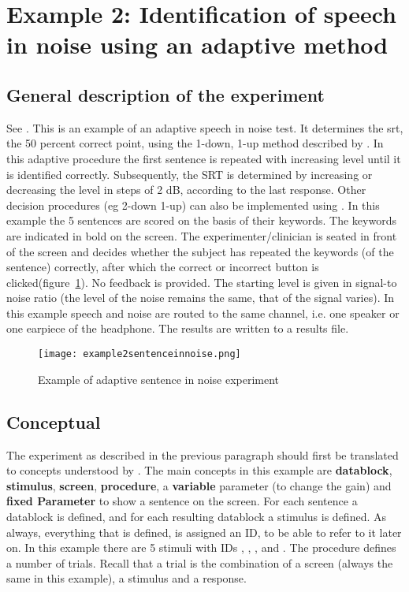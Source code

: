 \newpage
\section{Example 2: Identification of speech in noise using an adaptive method}

\subsection{General description of the experiment}
See . This is an
example of an adaptive speech in noise test. It determines the
 \ac{srt}, the 50 percent correct point, using
the 1-down, 1-up method described by \citet{PM79}. In this
adaptive procedure the first sentence is repeated with increasing
level until it is identified correctly. Subsequently, the SRT is
determined by increasing or decreasing the level in steps of 2 dB,
according to the last response. Other decision procedures (eg
2-down 1-up) can also be implemented using \apex. In this example
the 5 sentences are scored on the basis of their keywords. The
keywords are indicated in bold on the screen. The
experimenter/clinician is seated in front of the screen and
decides whether the subject has repeated the keywords (of the
sentence) correctly, after which the correct or incorrect button
is clicked(figure~\ref{fig:sentencenoise}). No feedback is
provided. The starting level is given in signal-to noise ratio
(the level of the noise remains the same, that of the signal
varies). In this example speech and noise are routed to the same
channel, i.e. one speaker or one earpiece of the headphone. The
results are written to a results file.

\begin{figure}
 \centering
 \texttt{[image: example2sentenceinnoise.png]}
 \caption{Example of adaptive sentence in noise experiment}
 \label{fig:sentencenoise}

\end{figure}
\subsection{Conceptual}
The experiment as described in the previous paragraph should first
be translated to concepts understood by \apex. The main concepts
in this example are \textbf{datablock}, \textbf{stimulus},
\textbf{screen}, \textbf{procedure}, a \textbf{variable} parameter
(to change the gain) and \textbf{fixed Parameter} to show a
sentence on the screen. For each sentence a datablock is defined,
and for each resulting datablock a stimulus is defined. As always,
everything that is defined, is assigned an ID, to be able to refer
to it later on. In this example there are 5 stimuli with IDs
, ,
,  and
. The procedure defines a number of trials.
Recall that a trial is the combination of a screen (always the
same in this example), a stimulus and a response.

